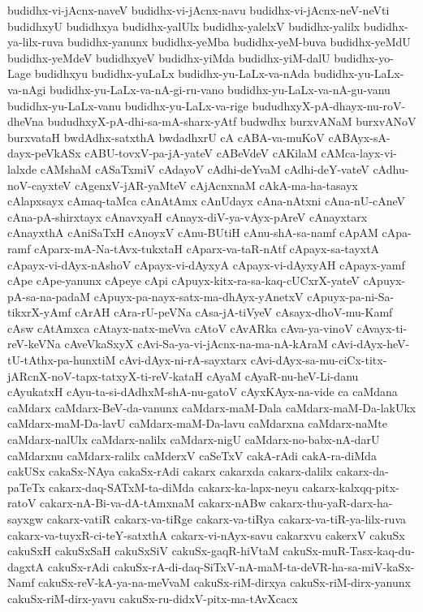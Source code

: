 {budidhx-vi-jAcnx-naveV
budidhx-vi-jAcnx-navu
budidhx-vi-jAcnx-neV-neVti
budidhxyU
budidhxya
budidhx-yalUlx
budidhx-yalelxV
budidhx-yalilx
budidhx-ya-lilx-ruva
budidhx-yanunx
budidhx-yeMba
budidhx-yeM-buva
budidhx-yeMdU
budidhx-yeMdeV
budidhxyeV
budidhx-yiMda
budidhx-yiM-dalU
budidhx-yo-Lage
budidhxyu
budidhx-yuLaLx
budidhx-yu-LaLx-va-nAda
budidhx-yu-LaLx-va-nAgi
budidhx-yu-LaLx-va-nA-gi-ru-vano
budidhx-yu-LaLx-va-nA-gu-vanu
budidhx-yu-LaLx-vanu
budidhx-yu-LaLx-va-rige
bududhxyX-pA-dhayx-nu-roV-dheVna
bududhxyX-pA-dhi-sa-mA-sharx-yAtf
budwdhx
burxvANaM
burxvANoV
burxvataH
bwdAdhx-satxthA
bwdadhxrU
cA
cABA-va-muKoV
cABAyx-sA-dayx-peVkASx
cABU-tovxV-pa-jA-yateV
cABeVdeV
cAKilaM
cAMca-layx-vi-lalxde
cAMshaM
cASaTxmiV
cAdayoV
cAdhi-deYvaM
cAdhi-deY-vateV
cAdhu-noV-cayxteV
cAgenxV-jAR-yaMteV
cAjAcnxnaM
cAkA-ma-ha-tasayx
cAlapxsayx
cAmaq-taMca
cAnAtAmx
cAnUdayx
cAna-nAtxni
cAna-nU-cAneV
cAna-pA-shirxtayx
cAnavxyaH
cAnayx-diV-ya-vAyx-pAreV
cAnayxtarx
cAnayxthA
cAniSaTxH
cAnoyxV
cAnu-BUtiH
cAnu-shA-sa-namf
cApAM
cApa-ramf
cAparx-mA-Na-tAvx-tukxtaH
cAparx-va-taR-nAtf
cApayx-sa-tayxtA
cApayx-vi-dAyx-nAshoV
cApayx-vi-dAyxyA
cApayx-vi-dAyxyAH
cApayx-yamf
cApe
cApe-yanunx
cApeye
cApi
cApuyx-kitx-ra-sa-kaq-cUCxrX-yateV
cApuyx-pA-sa-na-padaM
cApuyx-pa-nayx-satx-ma-dhAyx-yAnetxV
cApuyx-pa-ni-Sa-tikxrX-yAmf
cArAH
cAra-rU-peVNa
cAsa-jA-tiVyeV
cAsayx-dhoV-mu-Kamf
cAsw
cAtAmxca
cAtayx-natx-meVva
cAtoV
cAvARka
cAva-ya-vinoV
cAvayx-ti-reV-keVNa
cAveVkaSxyX
cAvi-Sa-ya-vi-jAcnx-na-ma-nA-kAraM
cAvi-dAyx-heV-tU-tAthx-pa-hunxtiM
cAvi-dAyx-ni-rA-sayxtarx
cAvi-dAyx-sa-mu-ciCx-titx-jARcnX-noV-tapx-tatxyX-ti-reV-kataH
cAyaM
cAyaR-nu-heV-Li-danu
cAyukatxH
cAyu-ta-si-dAdhxM-shA-nu-gatoV
cAyxKAyx-na-vide
ca
caMdana
caMdarx
caMdarx-BeV-da-vanunx
caMdarx-maM-Dala
caMdarx-maM-Da-lakUkx
caMdarx-maM-Da-lavU
caMdarx-maM-Da-lavu
caMdarxna
caMdarx-naMte
caMdarx-nalUlx
caMdarx-nalilx
caMdarx-nigU
caMdarx-no-babx-nA-darU
caMdarxnu
caMdarx-ralilx
caMderxV
caSeTxV
cakA-rAdi
cakA-ra-diMda
cakUSx
cakaSx-NAya
cakaSx-rAdi
cakarx
cakarxda
cakarx-dalilx
cakarx-da-paTeTx
cakarx-daq-SATxM-ta-diMda
cakarx-ka-lapx-neyu
cakarx-kalxqq-pitx-ratoV
cakarx-nA-Bi-va-dA-tAmxnaM
cakarx-nABw
cakarx-thu-yaR-darx-ha-sayxgw
cakarx-vatiR
cakarx-va-tiRge
cakarx-va-tiRya
cakarx-va-tiR-ya-lilx-ruva
cakarx-va-tuyxR-ci-teY-satxthA
cakarx-vi-nAyx-savu
cakarxvu
cakerxV
cakuSx
cakuSxH
cakuSxSaH
cakuSxSiV
cakuSx-gaqR-hiVtaM
cakuSx-muR-Tasx-kaq-du-dagxtA
cakuSx-rAdi
cakuSx-rA-di-daq-SiTxV-nA-maM-ta-deVR-ha-sa-miV-kaSx-Namf
cakuSx-reV-kA-ya-na-meVvaM
cakuSx-riM-dirxya
cakuSx-riM-dirx-yanunx
cakuSx-riM-dirx-yavu
cakuSx-ru-didxV-pitx-ma-tAvXcacx
}

